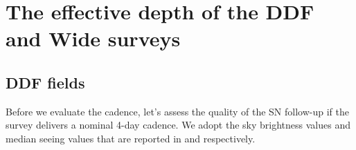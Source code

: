 \documentclass[\docopts]{\docclass}
\begin{document}
\section{The effective depth of the DDF and Wide surveys}
\label{sec:effective depth}

\subsection{DDF fields}

Before we evaluate the  cadence, let's assess the
quality of the SN follow-up if the survey delivers a nominal 4-day
cadence. We adopt the sky brightness values and median seeing values
that are reported in \cite{LSE-40} and \cite{SMTN-002} respectively.

\begin{figure}
\begin{center}

\end{center}
\end{figure}
\end{document}

